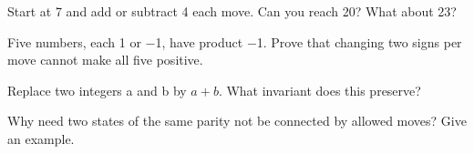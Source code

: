 \documentclass[11pt]{article}
\begin{document}
Start at 7 and add or subtract 4 each move. Can you reach 20? What about 23?\par
\vspace{5pt}
Five numbers, each 1 or −1, have product −1. Prove that changing two signs per move cannot make all five positive.\par
\vspace{5pt}
Replace two integers a and b by \(a + b\). What invariant does this preserve?\par
\vspace{5pt}
Why need two states of the same parity not be connected by allowed moves? Give an example.\par
\vspace{5pt}
\end{document}
